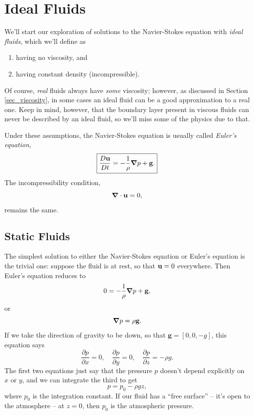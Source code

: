 \chapter{Ideal Fluids}

We'll start our exploration of solutions to the Navier-Stokes equation with \emph{ideal fluids}, which we'll define as 
\begin{enumerate}
\item having no viscosity, and
\item having constant density (incompressible).
\end{enumerate}
Of course, \emph{real} fluids always have \emph{some} viscosity; however, as discussed in Section \ref{sec_viscosity}, in some cases an ideal fluid can be a good approximation to a real one.  Keep in mind, however, that the boundary layer present in viscous fluids can never be described by an ideal fluid, so we'll miss some of the physics due to that.

Under these assumptions, the Navier-Stokes equation is usually called \emph{Euler's equation},
\begin{equation}
\label{eq_euler}
\boxed{
\frac{D \mathbf{u}}{Dt} = -\frac{1}{\rho} \boldsymbol{\nabla} p + \mathbf{g}.
}
\end{equation}
The incompressibility condition,
\begin{equation}
\boldsymbol{\nabla} \cdot \mathbf{u} = 0,
\end{equation}
remains the same.





\section{Static Fluids}

The simplest solution to either the Navier-Stokes equation or Euler's equation is the trivial one:  suppose the fluid is at rest, so that $\mathbf{u} = 0$ everywhere.  Then Euler's equation reduces to 
\[
0 = -\frac{1}{\rho} \boldsymbol{\nabla} p + \mathbf{g},
\]
or 
\[
\boldsymbol{\nabla} p = \rho \mathbf{g}.
\]
If we take the direction of gravity to be down, so that $\mathbf{g} = [0,0,-g]$, this equation says
\[
\frac{\partial p}{\partial x} = 0, \quad \frac{\partial p}{\partial y} = 0, \quad \frac{\partial p}{\partial z} = -\rho g.
\]
The first two equations just say that the pressure $p$ doesn't depend explicitly on $x$ or $y$, and we can integrate the third to get
\begin{equation}
p = p_0 - \rho g z,
\end{equation}
where $p_0$ is the integration constant.  If our fluid has a ``free surface'' -- it's open to the atmosphere -- at $z=0$, then $p_0$ is the atmospheric pressure.

